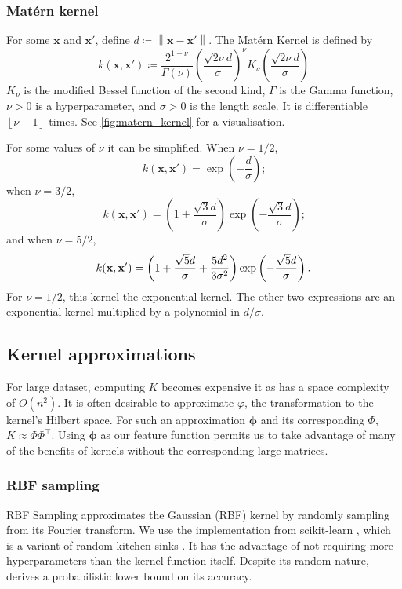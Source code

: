 \documentclass[11pt,twoside,openright]{report}
\newcommand\bphi{\bm{\phi}}
\newcommand\bx{\mathbf{x}}
\newcommand\norm[1]{\left\|#1\right\|}
\newcommand\floor[1]{\left\lfloor#1\right\rfloor}
\begin{document}
\subsubsection{Mat\'ern kernel}

For some $\bx$ and $\bx'$, define $d \coloneqq \norm{\bx - \bx'}$. The Mat\'ern Kernel is defined by \[
    k(\bx, \bx') \coloneqq \frac{2^{1-\nu}}{\Gamma(\nu)}\left(\frac{\sqrt{2\nu}d}{\sigma}\right)^\nu K_\nu\left(\frac{\sqrt{2\nu}d}{\sigma}\right)
\]$K_\nu$ is the modified Bessel function of the second kind, $\Gamma$ is the Gamma function, $\nu > 0$ is a hyperparameter, and $\sigma > 0$ is the length scale. It is differentiable $\floor{\nu-1}$ times. See \cref{fig:matern_kernel} for a visualisation.

For some values of $\nu$ it can be simplified. When $\nu = 1/2$,
 \[
   k(\bx, \bx') = \exp\left(-\frac{d}{\sigma}\right) \text{;}
 \] when $\nu=3/2$, \[
   k(\bx, \bx') = \left(1 + \frac{\sqrt{3}d}{\sigma}\right)\exp\left(-\frac{\sqrt{3}d}{\sigma}\right) \text{;}
 \] and when $\nu = 5/2$,\[
  k(\bx, \bx') = \left(1 + \frac{\sqrt{5}d}{\sigma} + \frac{5d^2}{3\sigma^2}\right)\exp\left(-\frac{\sqrt{5}d}{\sigma}\right) \text.
 \] For $\nu=1/2$, this kernel the exponential kernel. The other two expressions are an exponential kernel multiplied by a polynomial in $d/\sigma$.

\subsection{Kernel approximations}

For large dataset, computing $K$ becomes expensive it as has a space complexity of $O(n^2)$. It is often desirable to approximate $\varphi$, the transformation to the kernel's Hilbert space. For such an approximation $\bphi$ and its corresponding $\Phi$, $K \approx \Phi\Phi^\top$. Using $\bphi$ as our feature function permits us to take advantage of many of the benefits of kernels without the corresponding large matrices.

\subsubsection{RBF sampling}

RBF Sampling approximates the Gaussian (RBF) kernel by randomly sampling from its Fourier transform. We use the implementation from scikit-learn \citep{Sklearn}, which is a variant of random kitchen sinks \citep{KitchenSinks}. It has the advantage of not requiring more hyperparameters than the kernel function itself. Despite its random nature, \citep{KitchenSinks} derives a probabilistic lower bound on its accuracy.
\end{document}
